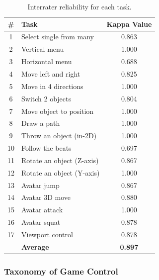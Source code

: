 \documentclass{sigchi}
\newcommand\tabhead[1]{\small\textbf{#1}}
\begin{document}
   \begin{table}
    \centering
    \begin{tabular}{|c|l|c|}
      \hline
      \tabhead{\#} &
      \multicolumn{1}{|p{0.4\columnwidth}|}{\centering\tabhead{Task}} &
      \multicolumn{1}{|p{0.2\columnwidth}|}{\centering\tabhead{Kappa Value}} \\
      \hline
      1 & Select single from many& 0.863\\
      \hline
      2 & Vertical menu & 1.000\\
      \hline
      3 & Horizontal menu & 0.688\\
      \hline
      4 & Move left and right & 0.825\\
      \hline
      5 & Move in 4 directions & 1.000\\
      \hline
      6 & Switch 2 objects & 0.804\\
      \hline
      7 & Move object to position & 1.000\\
      \hline
      8 & Draw a path & 1.000\\
      \hline
      9 & Throw an object (in-2D) & 1.000\\
      \hline
      10 & Follow the beats & 0.697\\
      \hline
      11 & Rotate an object (Z-axis) & 0.867 \\
      \hline
      12 & Rotate an object (Y-axis) & 1.000\\
      \hline
      13 & Avatar jump & 0.867\\
      \hline
      14 & Avatar 3D move & 0.880\\
      \hline
      15 & Avatar attack & 1.000\\
      \hline
      16 & Avatar squat & 0.878\\
      \hline
      17 & Viewport control & 0.878\\
      \hline
      & \bf{Average} & \bf{0.897}\\
      \hline

    \end{tabular}
    \caption{Interrater reliability for each task.}
    \label{tab:kappa}
  \end{table}


  \subsubsection{Taxonomy of Game Control}
       
\end{document}
